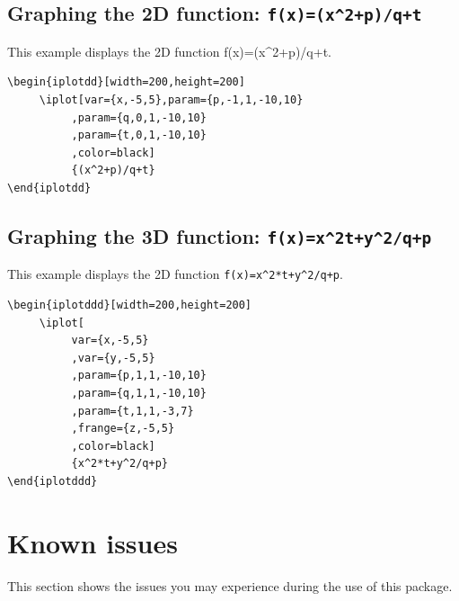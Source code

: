 \documentclass[a4paper,12pt]{article}
\begin{document}
\subsection{Graphing the 2D function: \texttt{f(x)=(x\textasciicircum2+p)/q+t}}
This example displays the 2D function f(x)=(x\textasciicircum2+p)/q+t.
\begin{verbatim}
\begin{iplotdd}[width=200,height=200]
     \iplot[var={x,-5,5},param={p,-1,1,-10,10}
          ,param={q,0,1,-10,10}
          ,param={t,0,1,-10,10}
          ,color=black]
          {(x^2+p)/q+t}
\end{iplotdd}
\end{verbatim}


\begin{iplotdd}[width=200,height=200]
\end{iplotdd}

\subsection{Graphing the 3D function: \texttt{f(x)=x\textasciicircum*2t+y\textasciicircum2/q+p}}
This example displays the 2D function \verb$f(x)=x^2*t+y^2/q+p$.

\begin{verbatim}
\begin{iplotddd}[width=200,height=200]
     \iplot[
          var={x,-5,5}
          ,var={y,-5,5}
          ,param={p,1,1,-10,10}
          ,param={q,1,1,-10,10}
          ,param={t,1,1,-3,7}
          ,frange={z,-5,5}
          ,color=black]
          {x^2*t+y^2/q+p}
\end{iplotddd}
\end{verbatim}

\begin{iplotddd}[width=200,height=200]
\end{iplotddd}


\clearpage

\section{Known issues}
	This section shows the issues you may experience during the use of this package.
	
\end{document}

